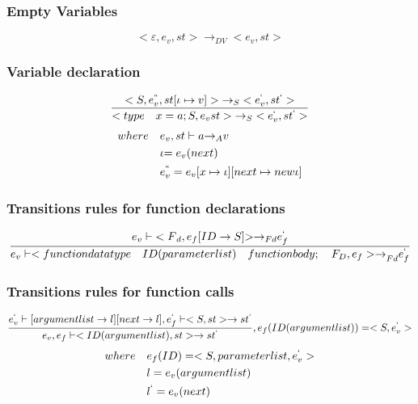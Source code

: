 \subsubsection{Empty Variables}
\begin{equation}
	<\varepsilon,{ e }_{ v },st>{ \rightarrow  }_{ DV }<{ e }_{ v },st>
\end{equation}

\subsubsection{Variable declaration}
\begin{equation}
	\frac { <S,{ e }_{ v }^{ `` },st[\iota \mapsto v]>{ \rightarrow  }_{ S }<{ e }_{ v }^{ ` },{ st }^{ ` }> }{ <type\quad x=a;S,{ e }_{ v }st>{ \rightarrow  }_{ S }<{ e }_{ v }^{ ` },{ st }^{ ` }> } 
\end{equation}
\begin{align*}
	where\quad &{ e }_{ v },st\vdash a{ \rightarrow  }_{ A }v \\
	&\iota {= e }_{ v }(next) \\
	&{ e }_{ v }^{ `` }={ e }_{ v }[x\mapsto \iota ][next\mapsto new \iota ]
\end{align*}

\subsubsection{Transitions rules for function declarations}
\begin{equation}
	\frac { { e }_{ v }\vdash { <F }_{ d },{ e }_{ f }[ID\rightarrow S]{ >\rightarrow  }_{ Fd }e_{ f }^{ ` } }{ { e }_{ v }\vdash <{ functiondatatype\quad ID(parameterlist)\quad functionbody;\quad { F }_{ D },{ e }_{ f }>\rightarrow  }_{ Fd }e_{ f }^{ ` } } 
\end{equation}

\subsubsection{Transitions rules for function calls}
\begin{equation}
	\frac { { e }_{ v }^{ ` }\vdash [{ argumentlist\rightarrow l] }[next\rightarrow l],{ e }_{ f }^{ ` }\vdash <S,st>\rightarrow { st }^{ ` } }{ { e }_{ v },{ e }_{ f }\vdash <ID(argumentlist),st>\rightarrow { st }^{ ` } } ,{ e }_{ f }(ID(argumentlist))=<S,{ e }_{ v }^{ ` }>
\end{equation}
\begin{align*}
where\quad &{ e }_{ f }(ID)=<S,parameterlist,{ e }_{ v }^{ ` }>
\\ &l={ e }_{ v }(argumentlist)
\\ &{ l }^{ ` }={ e }_{ v }(next)
\end{align*}

